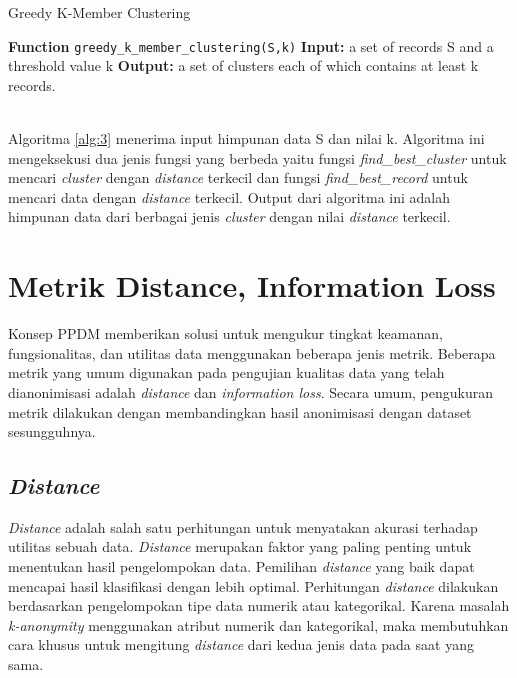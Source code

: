 \begin{algorithm}[H]
  \caption{Greedy K-Member Clustering}		 \label{alg:3}
  \begin{algorithmic}[1]
  \State \textbf{Function} \texttt{greedy\_k\_member\_clustering(S,k)}
  \State \textbf{Input:} a set of records S and a threshold value k
  \State \textbf{Output:} a set of clusters each of which contains at least k records.
  \\
  \EndIf
  \\
  	\EndWhile
  \EndWhile
  \EndWhile
  \end{algorithmic}
\end{algorithm}

Algoritma \ref{alg:3} menerima input himpunan data S dan nilai k. Algoritma ini mengeksekusi dua jenis fungsi yang berbeda yaitu fungsi \textit{find\_best\_cluster} untuk mencari \textit{cluster} dengan \textit{distance} terkecil dan fungsi \textit{find\_best\_record} untuk mencari data dengan \textit{distance} terkecil. Output dari algoritma ini adalah himpunan data dari berbagai jenis \textit{cluster} dengan nilai \textit{distance} terkecil.



\section{Metrik Distance, Information Loss} 
\label{theory:dist,il,cf}
Konsep PPDM memberikan solusi untuk mengukur tingkat keamanan, fungsionalitas, dan utilitas data menggunakan beberapa jenis metrik.  Beberapa metrik yang umum digunakan pada pengujian kualitas data yang telah dianonimisasi adalah \textit{distance} dan \textit{information loss}. Secara umum, pengukuran metrik dilakukan dengan membandingkan hasil anonimisasi dengan dataset sesungguhnya. 

\subsection{\textit{Distance}} 
\textit{Distance} adalah salah satu perhitungan untuk menyatakan akurasi terhadap utilitas sebuah data. \textit{Distance} merupakan faktor yang paling penting untuk menentukan hasil pengelompokan data. Pemilihan \textit{distance} yang baik dapat mencapai hasil klasifikasi dengan lebih optimal. Perhitungan \textit{distance} dilakukan berdasarkan pengelompokan tipe data numerik atau kategorikal. Karena masalah \textit{k-anonymity} menggunakan atribut numerik dan kategorikal, maka membutuhkan cara khusus untuk mengitung \textit{distance} dari kedua jenis data pada saat yang sama. 

